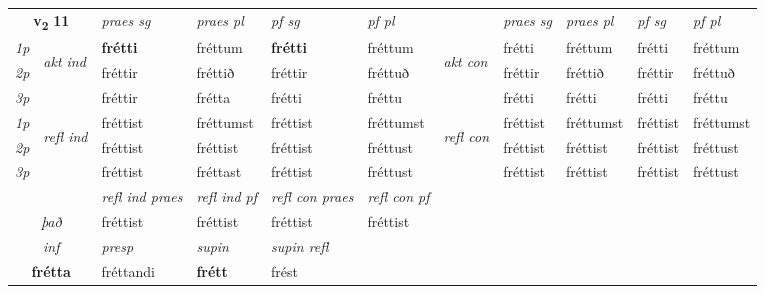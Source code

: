 \noindent
\begin{tabular}{lllllllllll} \toprule
\multicolumn{2}{c}{\textbf{v{\textsubscript{2}}} \Large{\textbf{11}}}  &  \textit{praes sg}  & \textit{praes pl}  &\textit{ pf sg} & \textit{pf pl} &  &  \textit{praes sg}  & \textit{praes pl}  & \textit{pf sg} & \textit{pf pl } \\*
	\cmidrule{3-6} \cmidrule{8-11}
 {\textit{1p}} & \multirow{3}{*}{\begin{turn}{90}\textit{akt ind}\end{turn}} & \textbf{frétti} & fréttum & \textbf{frétti} & fréttum & \multirow{3}{*}{\begin{turn}{90}\textit{akt con}\end{turn}} &frétti & fréttum & frétti & fréttum\\*
 {\textit{2p}} &  &  fréttir  & fréttið & fréttir & fréttuð & & fréttir & fréttið & fréttir & fréttuð \\*
{\textit{3p}} &  & fréttir & frétta & frétti & fréttu & & frétti & frétti& frétti & fréttu \\*
\cmidrule{3-6} \cmidrule{8-11}
 {\textit{1p}} & \multirow{3}{*}{\begin{turn}{90}\textit{refl ind}\end{turn}}  & fréttist & fréttumst & fréttist & fréttumst & \multirow{3}{*}{\begin{turn}{90}\textit{refl con}\end{turn}}  &fréttist & fréttumst & fréttist & fréttumst \\*
 {\textit{2p}} &  & fréttist & fréttist & fréttist & fréttust & &fréttist & fréttist & fréttist & fréttust \\*
 {\textit{3p}}  & & fréttist & fréttast & fréttist & fréttust & & fréttist & fréttist& fréttist & fréttust \\*
\cmidrule{3-6} \cmidrule{8-11}

 & & \textit{refl ind praes} & \textit{refl ind pf} & \textit{refl con praes} & \textit{refl con pf} \\*
 \multicolumn{2}{c}{ \textit{það} }& fréttist & fréttist & fréttist & fréttist \\*

\cmidrule{3-5}
   \multicolumn{2}{c}{\textit{inf}}     & \textit{presp} & \textit{supin} & \textit{supin refl}  \\*
  \multicolumn{2}{c}{\textbf{frétta}}      & fréttandi &  \textbf{frétt} & frést  \\*
\end{tabular}

